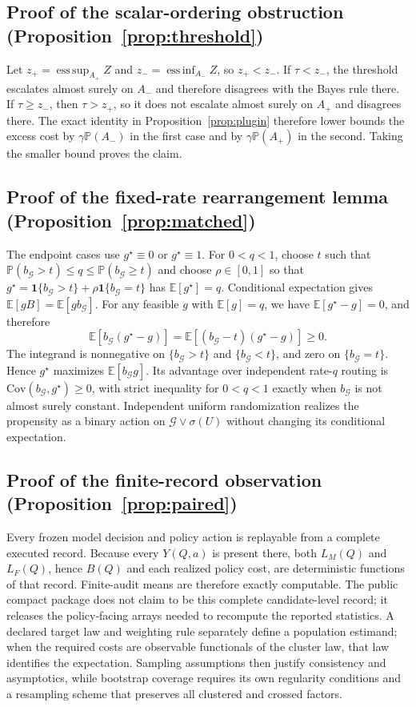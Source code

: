 \documentclass[10pt]{article}
\theoremstyle{definition}
\theoremstyle{remark}
\newcommand{\E}{\mathbb{E}}
\newcommand{\Prb}{\mathbb{P}}
\newcommand{\G}{\mathcal{G}}
\begin{document}
\subsection{Proof of the scalar-ordering obstruction (Proposition~\ref{prop:threshold})}
Let
$z_+=\operatorname*{ess\,sup}_{A_+}Z$ and
$z_-=\operatorname*{ess\,inf}_{A_-}Z$, so $z_+<z_-$.
If $\tau<z_-$, the threshold escalates almost surely on $A_-$ and therefore
disagrees with the Bayes rule there.  If $\tau\geq z_-$, then
$\tau>z_+$, so it does not escalate almost surely on $A_+$ and disagrees
there.  The exact identity in Proposition~\ref{prop:plugin} therefore lower
bounds the excess cost by $\gamma\Prb(A_-)$ in the first case and by
$\gamma\Prb(A_+)$ in the second.  Taking the smaller bound proves the claim.

\subsection{Proof of the fixed-rate rearrangement lemma (Proposition~\ref{prop:matched})}
The endpoint cases use $g^\star\equiv0$ or $g^\star\equiv1$.  For
$0<q<1$, choose $t$ such that
$\Prb(b_{\G}>t)\le q\le\Prb(b_{\G}\ge t)$ and choose
$\rho\in[0,1]$ so that
$g^\star=\mathbf1\{b_{\G}>t\}+\rho\mathbf1\{b_{\G}=t\}$ has
$\E[g^\star]=q$.  Conditional expectation gives $\E[gB]=\E[gb_{\G}]$.
For any feasible $g$ with $\E[g]=q$, we have $\E[g^\star-g]=0$, and therefore
\[
 \E[b_{\G}(g^\star-g)]
 =\E[(b_{\G}-t)(g^\star-g)]\ge0.
\]
The integrand is nonnegative on $\{b_{\G}>t\}$ and
$\{b_{\G}<t\}$, and zero on $\{b_{\G}=t\}$.  Hence $g^\star$
maximizes $\E[b_{\G}g]$.  Its advantage over independent rate-$q$ routing is
$\mathrm{Cov}(b_{\G},g^\star)\ge0$, with strict inequality for
$0<q<1$ exactly when $b_{\G}$ is not almost surely constant.  Independent uniform randomization
realizes the propensity as a binary action on
$\G\vee\sigma(U)$ without changing its conditional expectation.

\subsection{Proof of the finite-record observation (Proposition~\ref{prop:paired})}
Every frozen model decision and policy action is replayable from a complete
executed record.  Because every $Y(Q,a)$ is present there, both $L_M(Q)$ and
$L_F(Q)$, hence $B(Q)$ and each realized policy cost, are deterministic
functions of that record.  Finite-audit means are therefore exactly
computable.  The public compact package does not claim to be this complete
candidate-level record; it releases the policy-facing arrays needed to
recompute the reported statistics.  A declared target law and weighting rule
separately define a population estimand; when the required costs are observable
functionals of the cluster law, that law identifies the expectation.  Sampling assumptions then justify consistency and
asymptotics, while bootstrap coverage requires its own regularity conditions
and a resampling scheme that preserves all clustered and crossed factors.
\end{document}
